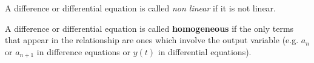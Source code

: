 \begin{definition}
    A difference or differential equation is called {\it non linear} if it is not linear.
\end{definition}
% 

\begin{definition}
    A difference or differential equation is called {\bf homogeneous} if the only terms that appear
    in the relationship are ones which involve the output variable (e.g. $a_n$ or
    $a_{n+1}$ in difference equations or $y(t)$ in differential equations).
\end{definition}

